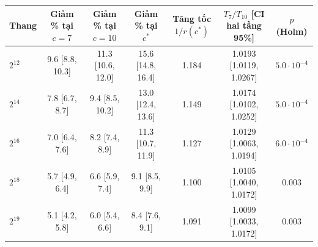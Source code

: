 \setlength{\tabcolsep}{3pt}
\begin{tabular}{lcccccc}
\toprule
Thang & \makecell{{Giảm \% tại} \\ {$c=7$}} & \makecell{{Giảm \% tại} \\ {$c=10$}} & \makecell{{Giảm \% tại} \\ {$c^*$}} & \makecell{{Tăng tốc} \\ {$1/r(c^*)$}} & \makecell{{$T_7/T_{10}$} \\ {[CI hai tầng 95\%]}} & \makecell{{$p$} \\ {(Holm)}} \\
\midrule
$2^{12}$ & 9.6 [8.8, 10.3] & 11.3 [10.6, 12.0] & 15.6 [14.8, 16.4] & 1.184 & 1.0193 [1.0119, 1.0267] & $5.0\cdot10^{-4}$ \\
$2^{14}$ & 7.8 [6.7, 8.7] & 9.4 [8.5, 10.2] & 13.0 [12.4, 13.6] & 1.149 & 1.0174 [1.0102, 1.0252] & $5.0\cdot10^{-4}$ \\
$2^{16}$ & 7.0 [6.4, 7.6] & 8.2 [7.4, 8.9] & 11.3 [10.7, 11.9] & 1.127 & 1.0129 [1.0063, 1.0194] & $6.0\cdot10^{-4}$ \\
$2^{18}$ & 5.7 [4.9, 6.4] & 6.6 [5.9, 7.4] & 9.1 [8.5, 9.9] & 1.100 & 1.0105 [1.0040, 1.0172] & 0.003 \\
$2^{19}$ & 5.1 [4.2, 5.8] & 6.0 [5.4, 6.6] & 8.4 [7.6, 9.1] & 1.091 & 1.0099 [1.0033, 1.0172] & 0.003 \\
\bottomrule
\end{tabular}
